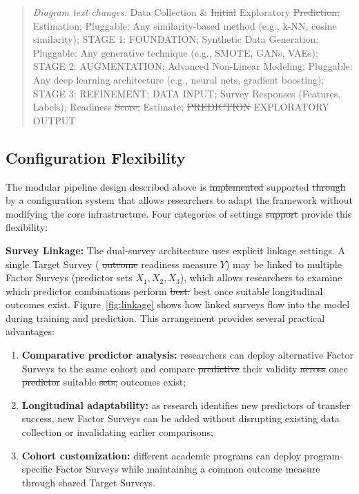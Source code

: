 \documentclass[letterpaper,11pt]{article}
\newcommand{\DIFdel}[1]{%
  \begingroup\setlength{\fboxsep}{0.5pt}%
  \colorbox{diffdelbg}{\textcolor{diffdeltext}{\sout{#1}}}%
  \endgroup}
\newcommand{\DIFadd}[1]{%
  \begingroup\setlength{\fboxsep}{0.5pt}%
  \colorbox{diffaddbg}{\textcolor{diffaddtext}{#1}}%
  \endgroup}
\begin{document}
\begin{quote}\footnotesize
\textit{Diagram text changes:} Data Collection \& \DIFdel{Initial} \DIFadd{Exploratory} \DIFdel{Prediction;} \DIFadd{Estimation;} Pluggable: Any similarity-based method (e.g., k-NN, cosine similarity); STAGE 1: FOUNDATION; Synthetic Data Generation; Pluggable: Any generative technique (e.g., SMOTE, GANs, VAEs); STAGE 2: AUGMENTATION; Advanced Non-Linear Modeling; Pluggable: Any deep learning architecture (e.g., neural nets, gradient boosting); STAGE 3: REFINEMENT; DATA INPUT; Survey Responses (Features, Labels); Readiness \DIFdel{Score;} \DIFadd{Estimate;} \DIFdel{PREDICTION} \DIFadd{EXPLORATORY} OUTPUT
\end{quote}

\subsection{Configuration Flexibility}\label{subsec:config}

The modular pipeline design described above is \DIFdel{implemented} \DIFadd{supported} \DIFdel{through} \DIFadd{by} a configuration system that allows researchers to adapt the framework without modifying the core infrastructure. Four categories of settings \DIFdel{support} \DIFadd{provide} this flexibility:

\textbf{Survey Linkage:} The dual-survey architecture uses explicit linkage settings. A single Target Survey (\DIFdel{outcome} \DIFadd{readiness} \DIFadd{measure} $Y$) may be linked to multiple Factor Surveys (predictor sets $X_1, X_2, X_3$), which allows researchers to examine which predictor combinations perform \DIFdel{best.} \DIFadd{best} \DIFadd{once} \DIFadd{suitable} \DIFadd{longitudinal} \DIFadd{outcomes} \DIFadd{exist.} Figure~\ref{fig:linkage} shows how linked surveys flow into the model during training and prediction. This arrangement provides several practical advantages:

\begin{enumerate}
    \item \textbf{Comparative predictor analysis:} researchers can deploy alternative Factor Surveys to the same cohort and compare \DIFdel{predictive} \DIFadd{their} validity \DIFdel{across} \DIFadd{once} \DIFdel{predictor} \DIFadd{suitable} \DIFdel{sets;} \DIFadd{outcomes} \DIFadd{exist;}
    \item \textbf{Longitudinal adaptability:} as research identifies new predictors of transfer success, new Factor Surveys can be added without disrupting existing data collection or invalidating earlier comparisons;
    \item \textbf{Cohort customization:} different academic programs can deploy program-specific Factor Surveys while maintaining a common outcome measure through shared Target Surveys.
\end{enumerate}
\end{document}
